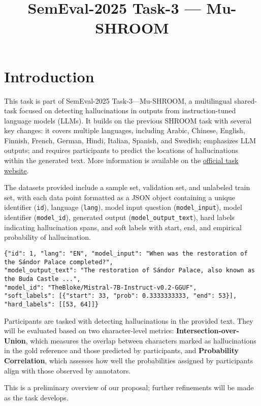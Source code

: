\documentclass{article}
\title{SemEval-2025 Task-3 — Mu-SHROOM}
\author{}
\date{}
\renewcommand{\normalsize}{\fontsize{10}{12}\selectfont}
\begin{document}
\maketitle

\section{Introduction}

This task is part of SemEval-2025 Task-3—Mu-SHROOM, a multilingual shared-task focused on detecting hallucinations in outputs from instruction-tuned language models (LLMs). It builds on the previous SHROOM task with several key changes: it covers multiple languages, including Arabic, Chinese, English, Finnish, French, German, Hindi, Italian, Spanish, and Swedish; emphasizes LLM outputs; and requires participants to predict the locations of hallucinations within the generated text. More information is available on the \href{https://helsinki-nlp.github.io/shroom/}{official task website}.

The datasets provided include a sample set, validation set, and unlabeled train set, with each data point formatted as a JSON object containing a unique identifier (\texttt{id}), language (\texttt{lang}), model input question (\texttt{model\_input}), model identifier (\texttt{model\_id}), generated output (\texttt{model\_output\_text}), hard labels indicating hallucination spans, and soft labels with start, end, and empirical probability of hallucination. 

\small
\begin{verbatim}
{"id": 1, "lang": "EN", "model_input": "When was the restoration of the Sándor Palace completed?", 
"model_output_text": "The restoration of Sándor Palace, also known as the Buda Castle ...", 
"model_id": "TheBloke/Mistral-7B-Instruct-v0.2-GGUF", 
"soft_labels": [{"start": 33, "prob": 0.3333333333, "end": 53}], "hard_labels": [[53, 64]]}
\end{verbatim}
\normalsize

Participants are tasked with detecting hallucinations in the provided text. They will be evaluated based on two character-level metrics: \textbf{Intersection-over-Union}, which measures the overlap between characters marked as hallucinations in the gold reference and those predicted by participants, and \textbf{Probability Correlation}, which assesses how well the probabilities assigned by participants align with those observed by annotators. 

This is a preliminary overview of our proposal; further refinements will be made as the task develops.
\end{document}

